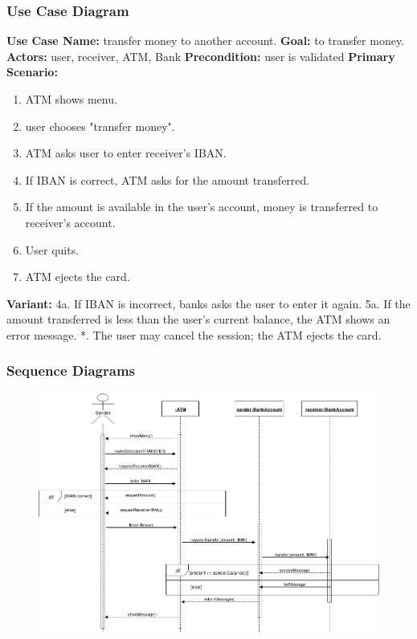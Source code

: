 \documentclass{article}
\begin{document}
		\subsubsection{Use Case Diagram}
		\textbf{Use Case Name:}	transfer money to another account.
		\newline\textbf{Goal:} to transfer money.
		\newline\textbf{Actors:} user, receiver, ATM, Bank 	
		\newline\textbf{Precondition:} user is validated 	
		\newline\textbf{Primary Scenario:}	
			\begin{enumerate}[label*=\arabic*.]
				\item ATM shows menu.
				\item user chooses "transfer money".
				\item ATM asks user to enter receiver's IBAN.
				\item If IBAN is correct, ATM asks for the amount transferred.
				\item If the amount is available in the user's account, money is transferred to receiver's account.
				\item User quits.
				\item ATM ejects the card.
			\end{enumerate}
		\textbf{Variant:}\newline	
			\hspace*{5mm}4a. If IBAN is incorrect, banks asks the user to enter it again.\newline
			\hspace*{5mm}5a. If the amount transferred is less than the user's current balance, the ATM shows an error message.\newline
			\hspace*{5mm}*. The user may cancel the session; the ATM ejects the card.

		\newpage\subsubsection{Sequence Diagrams}
		\begin{figure}[h!]
		  \includegraphics[width=\linewidth]{img/transfer_sequence.png}
		\end{figure}
\end{document}
